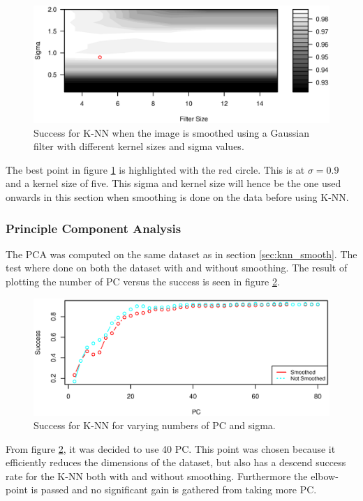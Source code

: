 \begin{figure}[H]
\centering
\includegraphics[width = 0.9 \textwidth]{graphics/knn_smooth_cont}
\caption{Success for K-NN when the image is smoothed using a Gaussian filter with different kernel sizes and sigma values.}
\label{fig:cont_smooth_gaus_knn}
\end{figure}

The best point in figure \ref{fig:cont_smooth_gaus_knn} is highlighted with the red circle.
This is at $\sigma = 0.9$ and a kernel size of five.
This sigma and kernel size will hence be the one used onwards in this section when smoothing is done on the data before using K-NN.


\subsubsection{Principle Component Analysis}

The PCA was computed on the same dataset as in section \ref{sec:knn_smooth}.
The test where done on both the dataset with and without smoothing.
The result of plotting the number of PC versus the success is seen in figure \ref{fig:plot_pca_knn}.

\begin{figure}[H]
\centering
\includegraphics[width = 0.9 \textwidth]{graphics/knn_pc}
\caption{Success for K-NN for varying numbers of PC and sigma.}
\label{fig:plot_pca_knn}
\end{figure}

From figure \ref{fig:plot_pca_knn}, it was decided to use 40 PC.
This point was chosen because it efficiently reduces the dimensions of the dataset, but also has a descend success rate for the K-NN both with and without smoothing.
Furthermore the elbow-point is passed and no significant gain is gathered from taking more PC.



